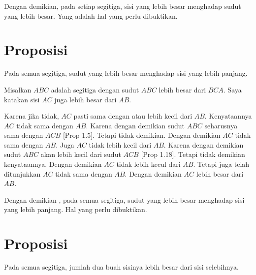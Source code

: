 \documentclass[a4paper]{book}
\begin{document}
Dengan demikian, pada setiap segitiga, sisi yang lebih besar menghadap sudut
yang lebih besar. Yang adalah hal yang perlu dibuktikan.

\section*{\centering Proposisi \thesection} 
Pada semua segitiga, sudut yang lebih besar menghadap sisi yang lebih panjang.
\begin{center}
\end{center} 

Misalkan $ABC$ adalah segitiga dengan sudut $ABC$ lebih besar dari $BCA$. 
Saya katakan sisi $AC$ juga lebih besar dari $AB$.

Karena jika tidak, $AC$ pasti sama dengan atau lebih kecil dari $AB$. Kenyataannya
$AC$ tidak sama dengan $AB$. Karena dengan demikian sudut $ABC$ seharusnya sama 
dengan $ACB$ [Prop 1.5]. Tetapi tidak demikian. Dengan demikian $AC$ tidak 
sama dengan $AB$. Juga $AC$ tidak lebih kecil dari $AB$. Karena dengan
demikian sudut $ABC$ akan lebih kecil dari sudut $ACB$ [Prop 1.18]. Tetapi
tidak demikian kenyataannya. Dengan demikian $AC$ tidak lebih kecul dari 
$AB$. Tetapi juga telah ditunjukkan $AC$ tidak sama dengan $AB$. Dengan demikian
$AC$ lebih besar dari $AB$.

Dengan demikian , pada semua segitiga, sudut yang lebih besar menghadap sisi yang
lebih panjang. Hal yang perlu dibuktikan.

\section*{\centering Proposisi \thesection}
Pada semua segitiga, jumlah dua buah sisinya lebih besar dari sisi selebihnya.

\begin{center}
\end{center}
\end{document}
